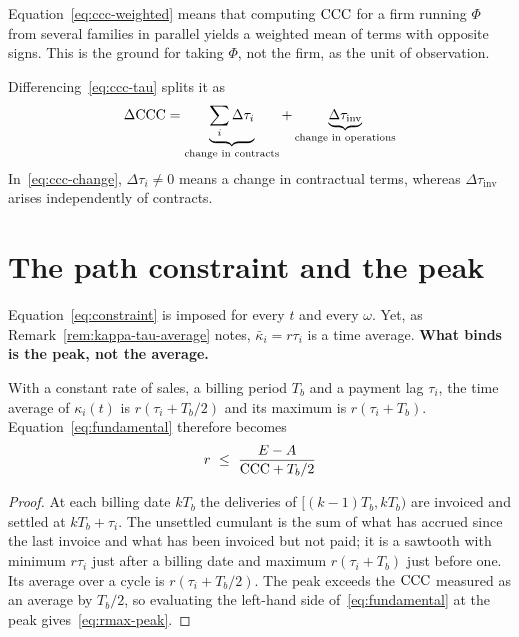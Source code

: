 Equation~\eqref{eq:ccc-weighted} means that computing $\mathrm{CCC}$ for a firm running $\Phi$ from
several families in parallel yields a weighted mean of terms with opposite signs. This is
the ground for taking $\Phi$, not the firm, as the unit of observation.

\begin{corollary}
\label{cor:ccc-change}
Differencing~\eqref{eq:ccc-tau} splits it as
\begin{equation}
\Delta\mathrm{CCC} = \underbrace{\sum_i \Delta\tau_i}_{\text{change in contracts}}
 + \underbrace{\Delta\tau_{\mathrm{inv}}}_{\text{change in operations}}
\label{eq:ccc-change}
\end{equation}
In~\eqref{eq:ccc-change}, $\Delta\tau_i\neq 0$ means a change in contractual terms, whereas
$\Delta\tau_{\mathrm{inv}}$ arises independently of contracts.
\end{corollary}

\section{The path constraint and the peak}
\label{sec:peak}

Equation~\eqref{eq:constraint} is imposed for every $t$ and every $\omega$. Yet, as
Remark~\ref{rem:kappa-tau-average} notes, $\bar\kappa_i=r\tau_i$ is a time average.
\textbf{What binds is the peak, not the average.}

\begin{proposition}
\label{prop:peak}
With a constant rate of sales, a billing period $T_b$ and a payment lag $\tau_i$, the time
average of $\kappa_i(t)$ is $r(\tau_i+T_b/2)$ and its maximum is $r(\tau_i+T_b)$.
Equation~\eqref{eq:fundamental} therefore becomes
\begin{equation}
r \ \leq\ \frac{E-A}{\mathrm{CCC} + T_b/2}
\label{eq:rmax-peak}
\end{equation}
\end{proposition}

\begin{proof}
At each billing date $kT_b$ the deliveries of $[(k-1)T_b,kT_b)$ are invoiced and settled at
$kT_b+\tau_i$. The unsettled cumulant is the sum of what has accrued since the last invoice
and what has been invoiced but not paid; it is a sawtooth with minimum $r\tau_i$ just after a
billing date and maximum $r(\tau_i+T_b)$ just before one. Its average over a cycle is
$r(\tau_i+T_b/2)$. The peak exceeds the $\mathrm{CCC}$ measured as an average by $T_b/2$, so
evaluating the left-hand side of~\eqref{eq:fundamental} at the peak
gives~\eqref{eq:rmax-peak}.
\end{proof}


